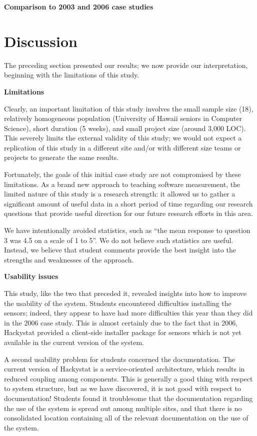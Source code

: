 \documentclass{acm_proc_article-sp}
\begin{document}
{\bf Comparison to 2003 and 2006 case studies}


\section{Discussion}

The preceding section presented our results; we now provide our interpretation, beginning with the limitations of this study.

{\bf Limitations}

Clearly, an important limitation of this study involves the small sample size (18), relatively homogeneous population (University of Hawaii seniors in Computer Science), short duration (5 weeks), and small project size (around 3,000 LOC).  This severely limits the external validity of this study; we would not expect a replication of this study in a different site and/or with different size teams or projects to generate the same results. 

Fortunately, the goals of this initial case study are not compromised by these limitations.  As a brand new approach to teaching software measurement, the limited nature of this study is a research strength: it allowed us to gather a significant amount of useful data in a short period of time regarding our research questions that provide useful direction for our future research efforts in this area. 

We have intentionally avoided statistics, such as ``the mean response to question 3 was 4.5 on a scale of 1 to 5''.  We do not believe such statistics are useful.  Instead, we believe that student comments provide the best insight into the strengths and weaknesses of the approach.  

{\bf Usability issues}

This study, like the two that preceded it, revealed insights into how to improve the usability of the system.  Students encountered difficulties installing the sensors; indeed, they appear to have had more difficulties this year than they did in the 2006 case study.  This is almost certainly due to the fact that in 2006, Hackystat provided a client-side installer package for sensors which is not yet available in the current version of the system.

A second usability problem for students concerned the documentation.  The current version of Hackystat is a service-oriented architecture, which results in reduced coupling among components.  This is generally a good thing with respect to system structure, but as we have discovered, it is not good with respect to documentation!   Students found it troublesome that the 
documentation regarding the use of the system is spread out among multiple sites, and that there is no consolidated location containing all of the relevant documentation on the use of the system.
\end{document}
